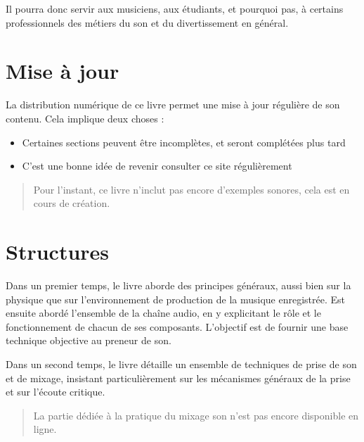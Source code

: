 \documentclass[
  letterpaper,
  DIV=11,
  numbers=noendperiod]{scrreprt}
\providecommand{\tightlist}{%
  \setlength{\itemsep}{0pt}\setlength{\parskip}{0pt}}\usepackage{longtable,booktabs,array}
\begin{document}
Il pourra donc servir aux musiciens, aux étudiants, et pourquoi pas, à
certains professionnels des métiers du son et du divertissement en
général.

\hypertarget{mise-uxe0-jour}{%
\section*{Mise à jour}\label{mise-uxe0-jour}}


La distribution numérique de ce livre permet une mise à jour régulière
de son contenu. Cela implique deux choses :

\begin{itemize}
\tightlist
\item
  Certaines sections peuvent être incomplètes, et seront complétées plus
  tard
\item
  C'est une bonne idée de revenir consulter ce site régulièrement
\end{itemize}

\begin{quote}
Pour l'instant, ce livre n'inclut pas encore d'exemples sonores, cela
est en cours de création.
\end{quote}

\hypertarget{structures}{%
\section*{Structures}\label{structures}}


Dans un premier temps, le livre aborde des principes généraux, aussi
bien sur la physique que sur l'environnement de production de la musique
enregistrée. Est ensuite abordé l'ensemble de la chaîne audio, en y
explicitant le rôle et le fonctionnement de chacun de ses composants.
L'objectif est de fournir une base technique objective au preneur de
son.

Dans un second temps, le livre détaille un ensemble de techniques de
prise de son et de mixage, insistant particulièrement sur les mécanismes
généraux de la prise et sur l'écoute critique.

\begin{quote}
La partie dédiée à la pratique du mixage son n'est pas encore disponible
en ligne.
\end{quote}
\end{document}
